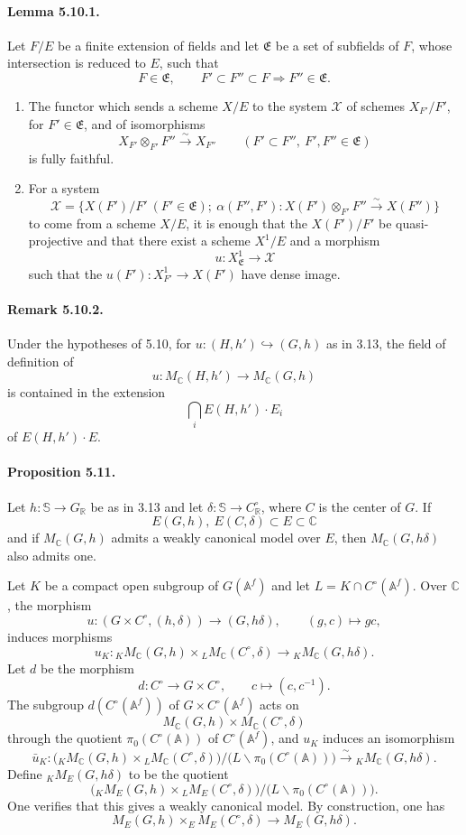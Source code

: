 \documentclass[10pt]{article}
\newcommand{\A}{\mathbb A}
\newcommand{\Af}{\mathbb A^f}
\newcommand{\C}{\mathbb C}
\newcommand{\R}{\mathbb R}
\newcommand{\bS}{\mathbb S}
\newcommand{\MC}{M_{\C}}
\begin{document}
\paragraph{Lemma 5.10.1.} Let $F/E$ be a finite extension of fields and let $\mathfrak E$ be a set of subfields of $F$, whose intersection is reduced to $E$, such that
\[
F\in\mathfrak E,\qquad F'\subset F''\subset F\Longrightarrow F''\in\mathfrak E.
\]
\begin{enumerate}[label=(\roman*)]
\item The functor which sends a scheme $X/E$ to the system $\mathcal X$ of schemes $X_{F'}/F'$, for $F'\in\mathfrak E$, and of isomorphisms
\[
X_{F'}\otimes_{F'}F''\xrightarrow{\sim}X_{F''}\qquad(F'\subset F'',\ F',F''\in\mathfrak E)
\]
is fully faithful.
\item For a system
\[
\mathcal X=\{X(F')/F'\ (F'\in\mathfrak E);\ \alpha(F'',F'):X(F')\otimes_{F'}F''\xrightarrow{\sim}X(F'')\}
\]
to come from a scheme $X/E$, it is enough that the $X(F')/F'$ be quasi-projective and that there exist a scheme $X^1/E$ and a morphism
\[
u:X^1_{\mathfrak E}\longrightarrow\mathcal X
\]
such that the $u(F'):X^1_{F'}\to X(F')$ have dense image.
\end{enumerate}

\paragraph{Remark 5.10.2.} Under the hypotheses of 5.10, for $u:(H,h')\hookrightarrow(G,h)$ as in 3.13, the field of definition of
\[
u:\MC(H,h')\longrightarrow\MC(G,h)
\]
is contained in the extension
\[
\bigcap_i E(H,h')\cdot E_i
\]
of $E(H,h')\cdot E$.

\paragraph{Proposition 5.11.} Let $h:\bS\to G_\R$ be as in 3.13 and let $\delta:\bS\to C^\circ_\R$, where $C$ is the center of $G$. If
\[
E(G,h),\ E(C,\delta)\subset E\subset\C
\]
and if $\MC(G,h)$ admits a weakly canonical model over $E$, then $\MC(G,h\delta)$ also admits one.

Let $K$ be a compact open subgroup of $G(\Af)$ and let $L=K\cap C^\circ(\Af)$. Over $\C$, the morphism
\[
u:(G\times C^\circ,(h,\delta))\longrightarrow(G,h\delta),\qquad (g,c)\longmapsto gc,
\]
induces morphisms
\[
u_K:{}_K\MC(G,h)\times {}_L\MC(C^\circ,\delta)
 \longrightarrow {}_K\MC(G,h\delta).
\]
Let $d$ be the morphism
\[
d:C^\circ\longrightarrow G\times C^\circ,\qquad c\longmapsto(c,c^{-1}).
\]
The subgroup $d(C^\circ(\Af))$ of $G\times C^\circ(\Af)$ acts on
\[
\MC(G,h)\times\MC(C^\circ,\delta)
\]
through the quotient $\pi_0(C^\circ(\A))$ of $C^\circ(\Af)$, and $u_K$ induces an isomorphism
\[
\bar u_K:\bigl({}_K\MC(G,h)\times{}_L\MC(C^\circ,\delta)\bigr)/
\bigl(L\backslash\pi_0(C^\circ(\A))\bigr)
\xrightarrow{\sim}{}_K\MC(G,h\delta).
\]
Define ${}_K M_E(G,h\delta)$ to be the quotient
\[
\bigl({}_K M_E(G,h)\times{}_L M_E(C^\circ,\delta)\bigr)/
\bigl(L\backslash\pi_0(C^\circ(\A))\bigr).
\]
One verifies that this gives a weakly canonical model. By construction, one has
\[
\tag{5.11.1}
M_E(G,h)\times_E M_E(C^\circ,\delta)\longrightarrow M_E(G,h\delta).
\]
\end{document}
